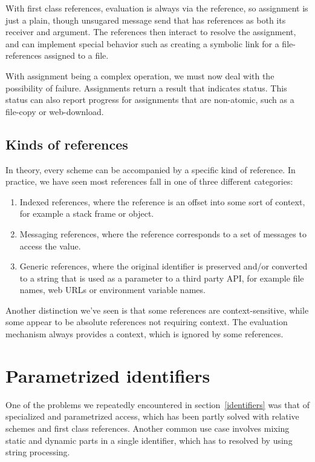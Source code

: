 \documentclass[preprint,authoryear]{llncs}
\begin{document}
With first class references, evaluation is always via the reference, so assignment is just a plain, though unsugared
message send that has references as both its receiver and argument.  The references then interact to resolve
the assignment, and can implement special behavior such as creating a symbolic link for a file-references assigned
to a file.

With assignment being a complex operation, we must now deal with the possibility of failure.  Assignments 
return a result that indicates status.  This status can also report progress for assignments that are
non-atomic, such as a file-copy or web-download.



\subsection{Kinds of references}
\label{refkinds}
In theory, every scheme can be accompanied by a specific kind of reference.  In practice, we have 
seen most references fall in one of three different categories:

\begin{enumerate}
\item Indexed references, where the reference is an offset into some sort of context, for
	example a stack frame or object.
\item Messaging references, where the reference corresponds to a set of messages to
	access the value.
\item Generic references, where the original identifier is preserved and/or converted to
	a string that is used as a parameter to a third party API, for example file names,
	web URLs or environment variable names.
\end{enumerate}

Another distinction we've seen is that some references are context-sensitive, while some
appear to be absolute references not requiring context.  The evaluation mechanism always
provides a context, which is ignored by some references.  


\section{Parametrized identifiers}
\label{parametrized}

One of the problems we repeatedly encountered in section~\ref{identifiers} was 
that of specialized and parametrized access, which has been partly solved with
relative schemes and first class references.  Another common use case involves
mixing static and dynamic parts in a single identifier, which has to resolved by
using string processing.
\end{document}
